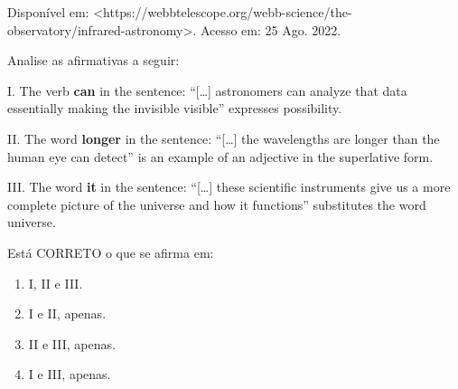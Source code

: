 Disponível em: <https://webbtelescope.org/webb-science/the-observatory/infrared-astronomy>. Acesso em: 25 Ago. 2022.

\par\medskip Analise as afirmativas a seguir:

I. The verb \textbf{can} in the sentence: “[…] astronomers can analyze that data essentially making the invisible visible” expresses possibility.

II. The word \textbf{longer} in the sentence: “[…] the wavelengths are longer than the human eye can detect” is an example of an adjective in the superlative form.

III. The word \textbf{it} in the sentence: “[…] these scientific instruments give us a more complete picture of the universe and how it functions” substitutes the word universe.

Está CORRETO o que se afirma em:
\begin{enumerate}
\item I, II e III.
\item I e II, apenas.
\item II e III, apenas.
\item I e III, apenas.
\end{enumerate}
